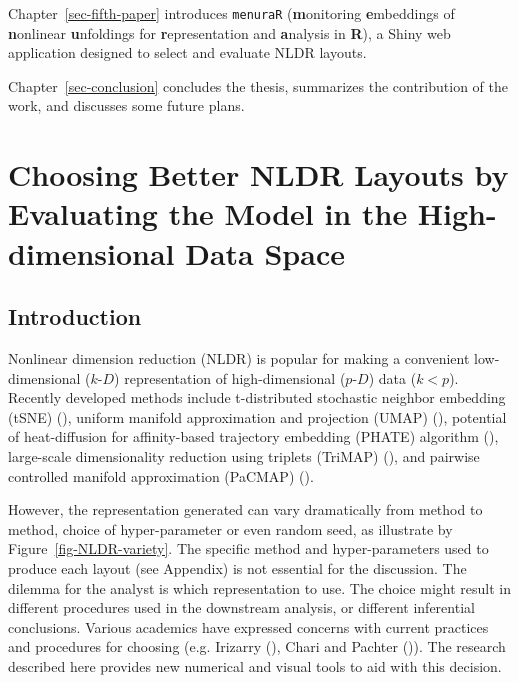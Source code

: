 \documentclass[
  11pt,
  a4paper,
]{report}
\newcommand\pD{$p\text{-}D$}
\newcommand\kD{$k\text{-}D$}
\begin{document}
Chapter~\ref{sec-fifth-paper} introduces \texttt{menuraR}
(\textbf{m}onitoring \textbf{e}mbeddings of \textbf{n}onlinear
\textbf{u}nfoldings for \textbf{r}epresentation and \textbf{a}nalysis in
\textbf{R}), a Shiny web application designed to select and evaluate
NLDR layouts.

Chapter~\ref{sec-conclusion} concludes the thesis, summarizes the
contribution of the work, and discusses some future plans.


\chapter{Choosing Better NLDR Layouts by Evaluating the Model in the
High-dimensional Data Space}\label{sec-first-paper}

\section{Introduction}\label{introduction}

Nonlinear dimension reduction (NLDR) is popular for making a convenient
low-dimensional (\kD{}) representation of high-dimensional (\pD{}) data
(\(k < p\)). Recently developed methods include t-distributed stochastic
neighbor embedding (tSNE) (), uniform manifold approximation and projection (UMAP)
(), potential of
heat-diffusion for affinity-based trajectory embedding (PHATE) algorithm
(), large-scale dimensionality
reduction using triplets (TriMAP)
(), and pairwise controlled
manifold approximation (PaCMAP) ().

However, the representation generated can vary dramatically from method
to method, choice of hyper-parameter or even random seed, as illustrate
by Figure~\ref{fig-NLDR-variety}. The specific method and
hyper-parameters used to produce each layout (see Appendix) is not
essential for the discussion. The dilemma for the analyst is which
representation to use. The choice might result in different procedures
used in the downstream analysis, or different inferential conclusions.
Various academics have expressed concerns with current practices and
procedures for choosing (e.g. Irizarry
(), Chari and Pachter
()). The research described here provides
new numerical and visual tools to aid with this decision.
\end{document}
